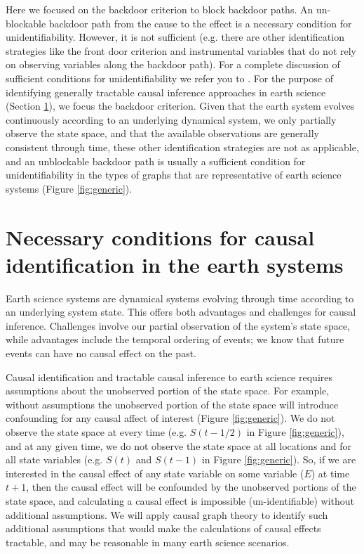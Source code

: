 \documentclass[12pt]{article}
\begin{document}
Here we focused on the backdoor criterion to block backdoor paths. An
un-blockable backdoor path from the cause to the effect is a necessary
condition for unidentifiability. However, it is not sufficient
(e.g. there are other identification strategies like the front door
criterion and instrumental variables that do not rely on observing
variables along the backdoor path). For a complete discussion of
sufficient conditions for unidentifiability we refer you to
\citet{shpitser2006}. For the purpose of identifying generally
tractable causal inference approaches in earth science (Section
\ref{sec:necess-cond-caus}), we focus the backdoor criterion. Given
that the earth system evolves continuously according to an underlying
dynamical system, we only partially observe the state space, and that
the available observations are generally consistent through time,
these other identification strategies are not as applicable, and an
unblockable backdoor path is usually a sufficient condition for
unidentifiability in the types of graphs that are representative of
earth science systems (Figure \ref{fig:generic}).

\section{Necessary conditions for causal identification in the earth
  systems}
\label{sec:necess-cond-caus}

Earth science systems are dynamical systems evolving through time
according to an underlying system state. This offers both advantages
and challenges for causal inference. Challenges involve our partial
observation of the system's state space, while advantages include the
temporal ordering of events; we know that future events can have no
causal effect on the past.

Causal identification and tractable causal inference to earth science
requires assumptions about the unobserved portion of the state
space. For example, without assumptions the unobserved portion of the
state space will introduce confounding for any causal affect of
interest (Figure \ref{fig:generic}). We do not observe the state space
at every time (e.g. $S(t-1/2)$ in Figure \ref{fig:generic}), and at
any given time, we do not observe the state space at all locations and
for all state variables (e.g. $S(t)$ and $S(t-1)$ in Figure
\ref{fig:generic}). So, if we are interested in the causal effect of
any state variable on some variable ($E$) at time $t+1$, then the
causal effect will be confounded by the unobserved portions of the
state space, and calculating a causal effect is impossible
(un-identifiable) without additional assumptions. We will apply causal
graph theory to identify such additional assumptions that would make
the calculations of causal effects tractable, and may be reasonable in
many earth science scenarios.
\end{document}
